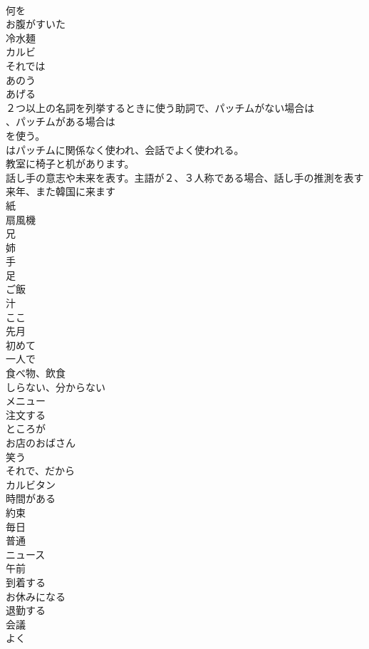 \documentclass[8pt]{extreport}
\begin{document}
\begin{CJK}{UTF8}{min}
\\	何を　
\\	お腹がすいた
\\	冷水麺
\\	カルビ
\\	それでは
\\	あのう
\\	あげる
\\	２つ以上の名詞を列挙するときに使う助詞で、パッチムがない場合は
\\	、パッチムがある場合は
\\	を使う。　
\\	はパッチムに関係なく使われ、会話でよく使われる。	
\\	教室に椅子と机があります。
\\	話し手の意志や未来を表す。主語が２、３人称である場合、話し手の推測を表す	
\\	来年、また韓国に来ます
\\	紙
\\	扇風機
\\	兄
\\	姉
\\	手
\\	足
\\	ご飯
\\	汁
\\	ここ
\\	先月
\\	初めて
\\	一人で
\\	食べ物、飲食
\\	しらない、分からない
\\	メニュー
\\	注文する
\\	ところが
\\	お店のおばさん
\\	笑う
\\	それで、だから
\\	カルビタン
\\	時間がある
\\	約束
\\	毎日
\\	普通
\\	ニュース
\\	午前
\\	到着する
\\	お休みになる
\\	退勤する
\\	会議
\\	よく

\end{CJK}
\end{document}
